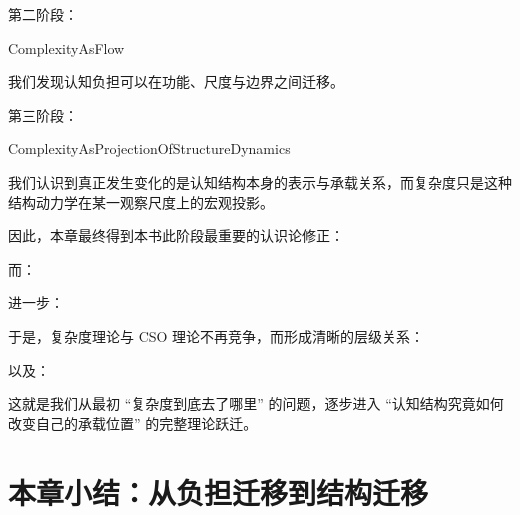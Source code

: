 第二阶段：

\begin{statementbox}
ComplexityAsFlow
\end{statementbox}

我们发现认知负担可以在功能、尺度与边界之间迁移。

第三阶段：

\begin{statementbox}
ComplexityAsProjectionOfStructureDynamics
\end{statementbox}

我们认识到真正发生变化的是认知结构本身的表示与承载关系，而复杂度只是这种结构动力学在某一观察尺度上的宏观投影。

因此，本章最终得到本书此阶段最重要的认识论修正：

\begin{statementbox}
\centering
{}
\end{statementbox}

而：

\begin{statementbox}
\centering
{}
\end{statementbox}

进一步：

\begin{statementbox}
\centering
{}
\end{statementbox}

于是，复杂度理论与 CSO 理论不再竞争，而形成清晰的层级关系：

\begin{statementbox}
\centering
{}
\end{statementbox}

以及：

\begin{statementbox}
\centering
{}
\end{statementbox}

这就是我们从最初 ``复杂度到底去了哪里'' 的问题，逐步进入 ``认知结构究竟如何改变自己的承载位置'' 的完整理论跃迁。

\section{本章小结：从负担迁移到结构迁移}
\label{sec:chapter12-summary}


